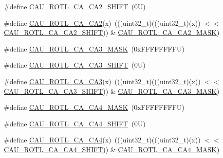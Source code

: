 \begin{DoxyCompactItemize}
\item 
\#define \mbox{\hyperlink{group___c_a_u___register___masks_ga8b25b4c825c9173a0abd5efdd58a82e4}{C\+A\+U\+\_\+\+R\+O\+T\+L\+\_\+\+C\+A\+\_\+\+C\+A2\+\_\+\+S\+H\+I\+FT}}~(0\+U)
\item 
\#define \mbox{\hyperlink{group___c_a_u___register___masks_ga75488166e5d5cb963886e5df06554dcb}{C\+A\+U\+\_\+\+R\+O\+T\+L\+\_\+\+C\+A\+\_\+\+C\+A2}}(x)~(((uint32\+\_\+t)(((uint32\+\_\+t)(x)) $<$$<$ \mbox{\hyperlink{group___c_a_u___register___masks_ga8b25b4c825c9173a0abd5efdd58a82e4}{C\+A\+U\+\_\+\+R\+O\+T\+L\+\_\+\+C\+A\+\_\+\+C\+A2\+\_\+\+S\+H\+I\+FT}})) \& \mbox{\hyperlink{group___c_a_u___register___masks_ga747bae472035b772b9099ece284b7520}{C\+A\+U\+\_\+\+R\+O\+T\+L\+\_\+\+C\+A\+\_\+\+C\+A2\+\_\+\+M\+A\+SK}})
\item 
\#define \mbox{\hyperlink{group___c_a_u___register___masks_gac3bb01fa4c02a43a9367a61519d287f2}{C\+A\+U\+\_\+\+R\+O\+T\+L\+\_\+\+C\+A\+\_\+\+C\+A3\+\_\+\+M\+A\+SK}}~(0x\+F\+F\+F\+F\+F\+F\+F\+F\+U)
\item 
\#define \mbox{\hyperlink{group___c_a_u___register___masks_gaefb05fe2e03750f3f2123bb5014e8d80}{C\+A\+U\+\_\+\+R\+O\+T\+L\+\_\+\+C\+A\+\_\+\+C\+A3\+\_\+\+S\+H\+I\+FT}}~(0\+U)
\item 
\#define \mbox{\hyperlink{group___c_a_u___register___masks_gafdde8a37c0517f2bc5637da808ef9252}{C\+A\+U\+\_\+\+R\+O\+T\+L\+\_\+\+C\+A\+\_\+\+C\+A3}}(x)~(((uint32\+\_\+t)(((uint32\+\_\+t)(x)) $<$$<$ \mbox{\hyperlink{group___c_a_u___register___masks_gaefb05fe2e03750f3f2123bb5014e8d80}{C\+A\+U\+\_\+\+R\+O\+T\+L\+\_\+\+C\+A\+\_\+\+C\+A3\+\_\+\+S\+H\+I\+FT}})) \& \mbox{\hyperlink{group___c_a_u___register___masks_gac3bb01fa4c02a43a9367a61519d287f2}{C\+A\+U\+\_\+\+R\+O\+T\+L\+\_\+\+C\+A\+\_\+\+C\+A3\+\_\+\+M\+A\+SK}})
\item 
\#define \mbox{\hyperlink{group___c_a_u___register___masks_gadbb02082ccfd702cac02e0201c2810ae}{C\+A\+U\+\_\+\+R\+O\+T\+L\+\_\+\+C\+A\+\_\+\+C\+A4\+\_\+\+M\+A\+SK}}~(0x\+F\+F\+F\+F\+F\+F\+F\+F\+U)
\item 
\#define \mbox{\hyperlink{group___c_a_u___register___masks_ga696c3db5a2a4f5c7452d2b3ff573f7c1}{C\+A\+U\+\_\+\+R\+O\+T\+L\+\_\+\+C\+A\+\_\+\+C\+A4\+\_\+\+S\+H\+I\+FT}}~(0\+U)
\item 
\#define \mbox{\hyperlink{group___c_a_u___register___masks_ga5f2d73933e12500c6b1e2c437c4255a4}{C\+A\+U\+\_\+\+R\+O\+T\+L\+\_\+\+C\+A\+\_\+\+C\+A4}}(x)~(((uint32\+\_\+t)(((uint32\+\_\+t)(x)) $<$$<$ \mbox{\hyperlink{group___c_a_u___register___masks_ga696c3db5a2a4f5c7452d2b3ff573f7c1}{C\+A\+U\+\_\+\+R\+O\+T\+L\+\_\+\+C\+A\+\_\+\+C\+A4\+\_\+\+S\+H\+I\+FT}})) \& \mbox{\hyperlink{group___c_a_u___register___masks_gadbb02082ccfd702cac02e0201c2810ae}{C\+A\+U\+\_\+\+R\+O\+T\+L\+\_\+\+C\+A\+\_\+\+C\+A4\+\_\+\+M\+A\+SK}})
$$
\end{DoxyCompactItemize}
